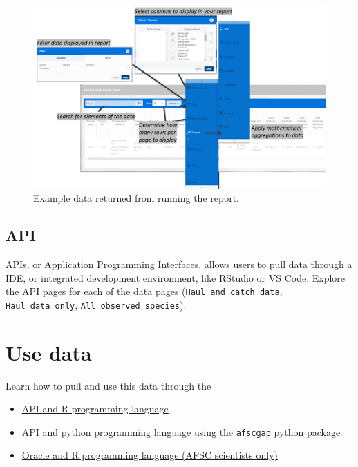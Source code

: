 \documentclass[
  letterpaper,
  oneside,
  open=any]{scrbook}
\providecommand{\tightlist}{%
  \setlength{\itemsep}{0pt}\setlength{\parskip}{0pt}}\usepackage{longtable,booktabs,array}
\begin{document}
\begin{figure}[H]

{\centering \includegraphics[width=5.97in,height=\textheight]{content/../img/foss_3_run_report.png}

}

\caption{Example data returned from running the report.}

\end{figure}%

\section{API}\label{api}

APIs, or Application Programming Interfaces, allows users to pull data
through a IDE, or integrated development environment, like RStudio or VS
Code. Explore the API pages for each of the data pages
(\texttt{Haul\ and\ catch\ data}, \texttt{Haul\ data\ only},
\texttt{All\ observed\ species}).

\chapter{Use data}\label{use-data}

Learn how to pull and use this data through the

\begin{itemize}
\tightlist
\item
  \href{https://afsc-gap-products.github.io/gap_products/content/foss-api-r.html}{API
  and R programming language}
\item
  \href{https://afsc-gap-products.github.io/gap_products/content/foss-api-py.html}{API
  and python programming language using the \texttt{afscgap} python
  package}
\item
  \href{https://afsc-gap-products.github.io/gap_products/content/foss-oracle-r.html}{Oracle
  and R programming language (AFSC scientists only)}
\end{itemize}
\end{document}
